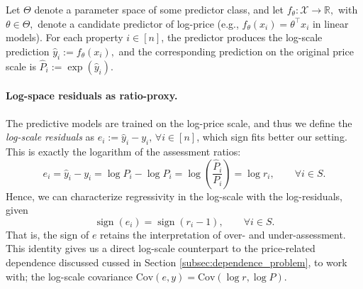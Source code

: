\documentclass[12pt, draft]{article}
\theoremstyle{plain}
\theoremstyle{definition}
\newcommand{\1}{\mathbf{1}}
\newcommand{\Cov}{\text{Cov}}
\begin{document}
Let $\Theta$ denote a parameter space of some predictor class, and let
$
f_\theta:\mathcal X\to\mathbb R,$
with $
\theta\in\Theta ,
$
denote a candidate predictor of log-price (e.g., $f_\theta(x_i)=\theta^\top x_i$ in linear models). For each property $i\in[n]$, the predictor produces the log-scale prediction
$
\hat y_i := f_\theta(x_i),
$
and the corresponding prediction on the original price scale is
$
\widehat P_i := \exp(\hat y_i).
$


\paragraph{Log-space residuals as ratio-proxy.} The predictive models are trained on the log-price scale, and thus we define the \textit{log-scale residuals} as
$
e_i := \hat y_i-y_i, \, \forall i \in [n]
$, which sign fits better our setting.
This is exactly the logarithm of the assessment ratios:
\begin{equation}
\label{eq:log_ratio_identity}
e_i
=
\hat y_i-y_i
=
\log \widehat P_i-\log P_i
=
\log\!\left(\frac{\widehat P_i}{P_i}\right)
=
\log r_i,
\qquad \forall i\in S.
\end{equation}
Hence, we can characterize regressivity in the log-scale with the log-residuals, given
\[
\operatorname{sign}(e_i)=\operatorname{sign}(r_i-1),
\qquad \forall i\in S.
\]
That is, the sign of $e$ retains the interpretation of over- and under-assessment. This identity gives us a direct log-scale counterpart to the price-related dependence discussed cussed in Section \ref{subsec:dependence_problem}, to work with; the log-scale covariance $\Cov(e, y) = \Cov(\log r, \log P)$. 



\end{document}
